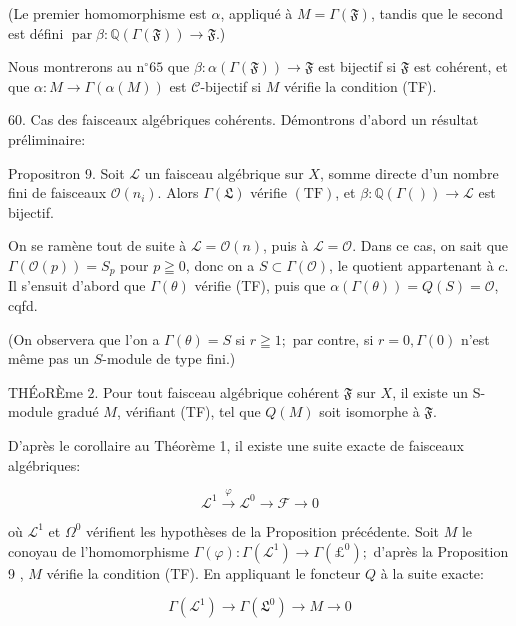 (Le premier homomorphisme est $\alpha$, appliqué à $M=\Gamma(\mathfrak{F})$, tandis que le second est défini $\operatorname{par} \beta: \mathbb{Q}(\Gamma(\mathfrak{F})) \rightarrow \mathfrak{F}$.)

Nous montrerons au $\mathrm{n}^{\circ} 65$ que $\beta: \mathbb{\alpha}(\Gamma(\mathfrak{F})) \rightarrow \mathfrak{F}$ est bijectif si $\mathfrak{F}$ est cohérent, et que $\alpha: M \rightarrow \Gamma(\alpha(M))$ est $\mathcal{C}$-bijectif si $M$ vérifie la condition (TF).

60. Cas des faisceaux algébriques cohérents. Démontrons d'abord un résultat préliminaire:

Propositron 9. Soit $\mathscr{L}$ un faisceau algébrique sur $X$, somme directe d'un nombre fini de faisceaux $\mathcal{O}\left(n_{i}\right) .$ Alors $\Gamma(\mathfrak{L})$ vérifie $(\mathrm{TF})$, et $\beta: \mathbb{Q}(\Gamma(\mathscr{})) \rightarrow \mathcal{L}$ est bijectif.

On se ramène tout de suite à $\mathcal{L}=\mathcal{O}(n)$, puis à $\mathscr{L}=\mathcal{O}$. Dans ce cas, on sait que $\Gamma(\mathcal{O}(p))=S_{p}$ pour $p \geqq 0$, donc on a $S \subset \Gamma(\mathcal{O})$, le quotient appartenant à $c .$ Il s'ensuit d'abord que $\Gamma(\theta)$ vérifie (TF), puis que $\alpha(\Gamma(\theta))=Q(S)=\mathcal{O}$, cqfd.

(On observera que l'on a $\Gamma(\theta)=S$ si $r \geqq 1 ;$ par contre, si $r=0, \Gamma(0)$ n'est même pas un $S$-module de type fini.)

THÉoRÈme $2 .$ Pour tout faisceau algébrique cohérent $\mathfrak{F}$ sur $X$, il existe un S-module gradué $M$, vérifiant (TF), tel que $Q(M)$ soit isomorphe à $\mathfrak{F}$.

D'après le corollaire au Théorème 1, il existe une suite exacte de faisceaux algébriques:

$$
\mathcal{L}^{1} \stackrel{\varphi}{\rightarrow} \mathcal{L}^{0} \rightarrow \mathcal{F} \rightarrow 0
$$

où $\mathcal{L}^{1}$ et $\mathscr{\Omega}^{0}$ vérifient les hypothèses de la Proposition précédente. Soit $M$ le conoyau de l'homomorphisme $\Gamma(\varphi): \Gamma\left(\mathscr{L}^{1}\right) \rightarrow \Gamma\left(£^{0}\right) ;$ d'après la Proposition 9 , $M$ vérifie la condition (TF). En appliquant le foncteur $Q$ à la suite exacte:

$$
\Gamma\left(\mathcal{L}^{1}\right) \rightarrow \Gamma\left(\mathfrak{L}^{0}\right) \rightarrow M \rightarrow 0
$$

